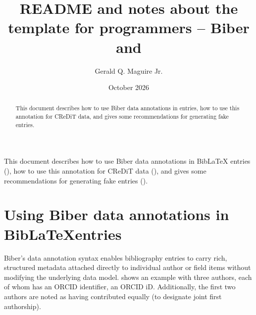 \documentclass[12pt, twoside]{article}
\title{README and notes about the template for programmers -- Biber and \BibLaTeX{}}
\author{Gerald Q. Maguire Jr.}
\date{October 2026}
\renewcommand{\sectionmark}[1]{%
\markboth{#1}{}}
\begin{document}
\glsresetall
\maketitle
{}

\begin{abstract}
This document describes how to use Biber data annotations in \BibLaTeX{} entries, how to use this annotation for \gls{CReDiT} data, and gives some recommendations for generating fake \BibLaTeX{} entries.

\end{abstract}
\cleardoublepage


\renewcommand{\sectionmark}[1]{ \markboth{#1}{}}
\tableofcontents
\markboth{\contentsname}{}
\cleardoublepage
 
\setcounter{page}{1}
\glsresetall
This document describes how to use Biber data annotations in BibLaTeX entries (), how to use this annotation for \gls{CReDiT} data (), and gives some recommendations for generating fake \BibLaTeX{} entries ().


\section[Using Biber data annotations in BibLaTeX entries]{Using Biber data annotations in BibLaTeX\linebreak[4] entries}
\label{sec:furtherBiberAnnotation}

Biber's data annotation syntax enables bibliography entries to carry rich, structured metadata attached directly to individual author or field items without modifying the underlying \BibLaTeX{} data model.  shows an example with three authors, each of whom has an \gls{ORCID} identifier, \ie an ORCID iD. Additionally, the first two authors are noted as having contributed equally (\eg to designate joint first authorship).
\end{document}
